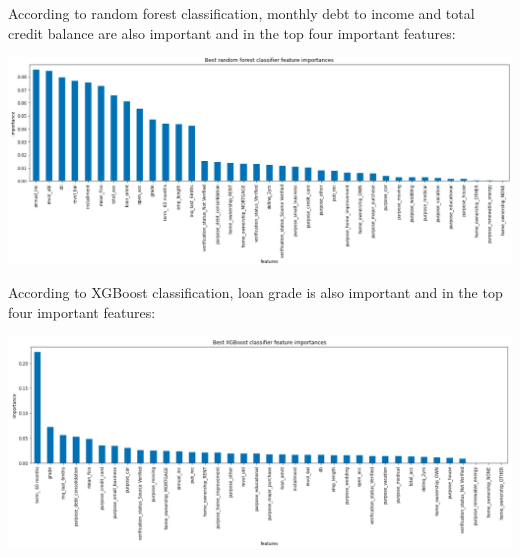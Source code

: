 \documentclass[11pt]{article}
\begin{document}
According to random forest classification, monthly debt to income and total
credit balance are also important and in the top four important features:
\begin{center}
\includegraphics[scale=0.35]{random-forest-feature-importances.png}
\end{center}
According to XGBoost classification, loan grade is also important and in the
top four important features:
\begin{center}
\includegraphics[scale=0.35]{xgboost-feature-importances.png}
\end{center}
\end{document}
